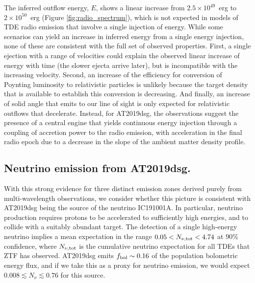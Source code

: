 \documentclass{nature_plusfigure}
\begin{document}
The inferred outflow energy, $E$, shows a linear increase from $2.5 \times 10^{49}$~erg to $2 \times 10^{50}$~erg (Figure \ref{fig:radio_spectrum}), which is not expected in models\cite{2016ApJ...819L..25A,2016ApJ...827..127K} of TDE radio emission that involve a single injection of energy. While some scenarios can yield an increase in inferred energy from a single energy injection, none of these are consistent with the full set of observed properties. First, a single ejection with a range of velocities could explain the observed linear increase of energy with time (the slower ejecta arrive later), but is incompatible with the increasing velocity. Second, an increase of the efficiency for conversion of Poynting luminosity to relativistic particles is unlikely because the target density that is available to establish this conversion is decreasing.  And finally, an increase of solid angle that emits to our line of sight is only expected for relativistic outflows that decelerate. Instead, for AT2019dsg, the observations suggest the presence of a central engine that yields continuous energy injection through a coupling of accretion power to the radio emission\cite{2018ApJ...856....1P}, with acceleration in the final radio epoch due to a decrease in the slope of the ambient matter density profile. 

\subsection{Neutrino emission from AT2019dsg.} With this strong evidence for three distinct emission zones derived purely from multi-wavelength observations, we consider whether this picture is consistent with AT2019dsg being the source of the neutrino IC191001A. In particular, neutrino production requires protons to be accelerated to sufficiently high energies, and to collide with a suitably abundant target. The detection of a single high-energy neutrino implies a mean expectation in the range $0.05 < N_{\nu, \textup{tot}} < 4.74$ at 90\% confidence, where $N_{\nu, \textup{tot}}$ is the cumulative neutrino expectation for all TDEs that ZTF has observed. AT2019dsg emits $f_{\rm bol} \sim 0.16$ of the population bolometric energy flux, and if we take this as a proxy for neutrino emission, we would expect $0.008 \lesssim N_{\nu} \lesssim 0.76$ for this source.

\end{document}
